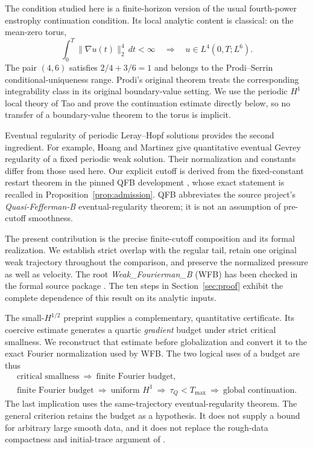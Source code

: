 \documentclass[11pt,a4paper]{article}
\numberwithin{equation}{section}
\theoremstyle{plain}
\theoremstyle{definition}
\theoremstyle{remark}
\newcommand{\norm}[2]{\lVert #1\rVert_{#2}}
\newcommand{\Tmax}{T_{\max}}
\newcommand{\tq}{\tau_Q}
\begin{document}
The condition studied here is a finite-horizon version of the usual
fourth-power enstrophy continuation condition. Its local analytic content
is classical: on the mean-zero torus,
\[
 \int_0^T\norm{\nabla u(t)}{2}^4\,dt<\infty
 \quad\Longrightarrow\quad u\in L^4(0,T;L^6).
\]
The pair $(4,6)$ satisfies $2/4+3/6=1$ and belongs to the
Prodi--Serrin conditional-uniqueness range. Prodi's original theorem
\cite{prodi} treats the corresponding integrability class in its original
boundary-value setting. We use the periodic $H^1$ local theory of
Tao \cite[Theorem~5.1 and Corollary~5.2]{tao} and prove the continuation
estimate directly below, so no transfer of a boundary-value theorem to
the torus is implicit.

Eventual regularity of periodic Leray--Hopf solutions provides the second
ingredient. For example, Hoang and Martinez
\cite[Theorem~2.4]{hoangmartinez} give quantitative eventual Gevrey
regularity of a fixed periodic weak solution. Their normalization and
constants differ from those used here. Our explicit cutoff is derived
from the fixed-constant restart theorem in the pinned QFB development
\cite{methlib}, whose exact statement is recalled in
Proposition~\ref{prop:admission}. QFB abbreviates the source project's
\emph{Quasi-Fefferman-B} eventual-regularity theorem; it is not an
assumption of pre-cutoff smoothness.

The present contribution is the precise finite-cutoff composition and
its formal realization. We establish strict overlap with the regular
tail, retain one original weak trajectory throughout the comparison,
and preserve the normalized pressure as well as velocity. The root
\emph{Weak\_Fourierman\_B} (WFB) has been checked in the formal
source package \cite{methboke}. The ten steps in Section~\ref{sec:proof}
exhibit the complete dependence of this result on its analytic inputs.

The small-$H^{1/2}$ preprint \cite{small} supplies a complementary,
quantitative certificate. Its coercive estimate generates a quartic
\emph{gradient} budget under strict critical smallness. We reconstruct
that estimate before globalization and convert it to the exact Fourier
normalization used by WFB. The two logical uses of a budget are thus
\[
\begin{gathered}
\text{critical smallness}\ \Longrightarrow\ \text{finite Fourier budget},\\
\text{finite Fourier budget}\ \Longrightarrow\ \text{uniform }H^1
\ \Longrightarrow\ \tq<\Tmax
\ \Longrightarrow\ \text{global continuation}.
\end{gathered}
\]
The last implication uses the same-trajectory eventual-regularity theorem.
The general criterion retains the budget as a hypothesis. It does not
supply a bound for arbitrary large smooth data, and it does not replace
the rough-data compactness and initial-trace argument of \cite{small}.
\end{document}
